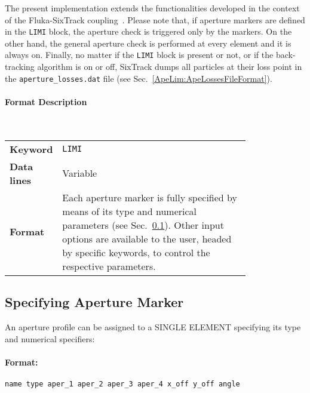 The present implementation extends the functionalities developed in the context of the Fluka-SixTrack coupling~\cite{coupling:1,coupling:2}.
Please note that, if aperture markers are defined in the \texttt{LIMI} block, the aperture check is triggered only by the markers.
On the other hand, the general aperture check is performed at every element and it is always on.
Finally, no matter if the \texttt{LIMI} block is present or not, or if the back-tracking algorithm is on or off, SixTrack dumps all particles at their loss point in the \texttt{aperture\_losses.dat} file (see Sec.~\ref{ApeLim:ApeLossesFileFormat}).

\newpage
\paragraph{Format Description}~

\bigskip
\begin{tabular}{@{}lp{0.8\linewidth}}
    \textbf{Keyword}    & \texttt{LIMI}\index{LIMI} \\
    \textbf{Data lines} & Variable \\
    \textbf{Format}     & Each aperture marker is fully specified by means of its type and
                          numerical parameters (see Sec.~\ref{ApeLim:ApeSpecs}).
                          Other input options are available to the user,
                          headed by specific keywords, to control the respective parameters.
\end{tabular}

\bigskip
\subsection{Specifying Aperture Marker}\label{ApeLim:ApeSpecs}
An aperture profile can be assigned to a SINGLE ELEMENT specifying its type and numerical specifiers:

\paragraph{Format:}
\texttt{name type aper\_1 aper\_2 aper\_3 aper\_4 x\_off y\_off angle}


